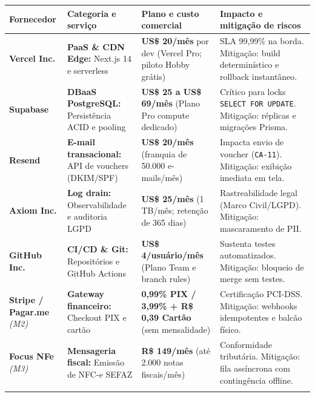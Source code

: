 {\footnotesize
\begin{tabularx}{\textwidth}{>{\hsize=0.556\hsize\sloppy\arraybackslash}X >{\hsize=0.905\hsize\sloppy\arraybackslash}X >{\hsize=0.978\hsize\sloppy\arraybackslash}X >{\hsize=1.562\hsize\sloppy\arraybackslash}X}
\arrayrulecolor{GithubTableBorder}\toprule
\rowcolor{BrandTableHeader}
\textbf{Fornecedor} & \textbf{Categoria e serviço} & \textbf{Plano e custo comercial} & \textbf{Impacto e mitigação de riscos} \\
\midrule
\arrayrulecolor{BrandGrayRule}
\textbf{Vercel Inc.} & \textbf{PaaS \& CDN Edge:} Next.js 14 e serverless & \textbf{US\$ 20/mês} por dev (Vercel Pro; piloto Hobby grátis) & SLA 99,99\% na borda. Mitigação: build determinístico e rollback instantâneo. \\
\midrule
\textbf{Supabase} & \textbf{DBaaS PostgreSQL:} Persistência ACID e pooling & \textbf{US\$ 25 a US\$ 69/mês} (Plano Pro compute dedicado) & Crítico para locks \texttt{SELECT\ FOR\ UPDATE}. Mitigação: réplicas e migrações Prisma. \\
\midrule
\textbf{Resend} & \textbf{E-mail transacional:} API de vouchers (DKIM/SPF) & \textbf{US\$ 20/mês} (franquia de 50.000 e-mails/mês) & Impacta envio de voucher (\texttt{CA-11}). Mitigação: exibição imediata em tela. \\
\midrule
\textbf{Axiom Inc.} & \textbf{Log drain:} Observabilidade e auditoria LGPD & \textbf{US\$ 25/mês} (1 TB/mês; retenção de 365 dias) & Rastreabilidade legal (Marco Civil/LGPD). Mitigação: mascaramento de PII. \\
\midrule
\textbf{GitHub Inc.} & \textbf{CI/CD \& Git:} Repositórios e GitHub Actions & \textbf{US\$ 4/usuário/mês} (Plano Team e branch rules) & Sustenta testes automatizados. Mitigação: bloqueio de merge sem testes. \\
\midrule
\textbf{Stripe / Pagar.me} \emph{(M2)} & \textbf{Gateway financeiro:} Checkout PIX e cartão & \textbf{0,99\% PIX / 3,99\% + R\$ 0,39 Cartão} (sem mensalidade) & Certificação PCI-DSS. Mitigação: webhooks idempotentes e balcão físico. \\
\midrule
\textbf{Focus NFe} \emph{(M3)} & \textbf{Mensageria fiscal:} Emissão de NFC-e SEFAZ & \textbf{R\$ 149/mês} (até 2.000 notas fiscais/mês) & Conformidade tributária. Mitigação: fila assíncrona com contingência offline. \\
\arrayrulecolor{GithubTableBorder}\bottomrule
\end{tabularx}%
}
